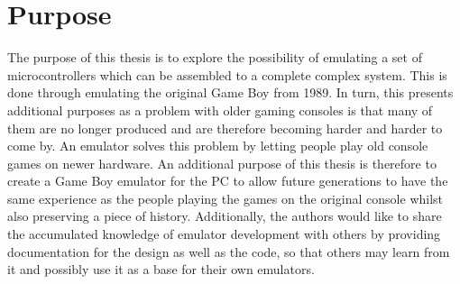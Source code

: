 \section{Purpose}
The purpose of this thesis is to explore the possibility of emulating a set of microcontrollers which can be assembled to a complete complex system. This is done through emulating the original Game Boy from 1989. In turn, this presents additional purposes as a problem with older gaming consoles is that many of them are no longer produced and are therefore becoming harder and harder to come by. An emulator solves this problem by letting people play old console games on newer hardware. An additional purpose of this thesis is therefore to create a Game Boy emulator for the PC to allow future generations to have the same experience as the people playing the games on the original console whilst also preserving a piece of history. Additionally, the authors would like to share the accumulated knowledge of emulator development with others by providing documentation for the design as well as the code, so that others may learn from it and possibly use it as a base for their own emulators.

